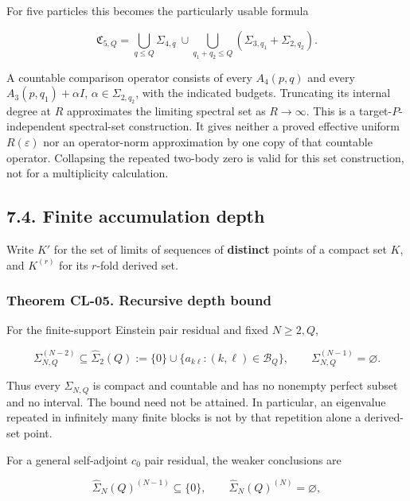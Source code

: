 For five particles this becomes the particularly usable formula

\[
\mathfrak C_{5,Q}=
\bigcup_{q\leq Q}\Sigma_{4,q}
\ \cup\!
\bigcup_{q_1+q_2\leq Q}(\Sigma_{3,q_1}+\Sigma_{2,q_2}).
\tag{CL.14}
\]

A countable comparison operator consists of every \(A_4(p,q)\) and every \(A_3(p,q_1)+\alpha I\), \(\alpha\in\Sigma_{2,q_2}\), with the indicated budgets. Truncating its internal degree at \(R\) approximates the limiting spectral set as \(R\to\infty\). This is a target-\(P\)-independent spectral-set construction. It gives neither a proved effective uniform \(R(\varepsilon)\) nor an operator-norm approximation by one copy of that countable operator. Collapsing the repeated two-body zero is valid for this set construction, not for a multiplicity calculation.

\hypertarget{finite-accumulation-depth}{%
\subsection{7.4. Finite accumulation depth}\label{finite-accumulation-depth}}

Write \(K'\) for the set of limits of sequences of \textbf{distinct} points of a compact set \(K\), and \(K^{(r)}\) for its \(r\)-fold derived set.

\hypertarget{theorem-cl-05.-recursive-depth-bound}{%
\subsubsection{Theorem CL-05. Recursive depth bound}\label{theorem-cl-05.-recursive-depth-bound}}

For the finite-support Einstein pair residual and fixed \(N\geq2,Q\),

\[
\Sigma_{N,Q}^{(N-2)}\subseteq
\widehat\Sigma_2(Q):=\{0\}\cup\{a_{k\ell}:(k,\ell)\in\mathcal B_Q\},
\qquad
\Sigma_{N,Q}^{(N-1)}=\varnothing.
\tag{CL.15}
\]

Thus every \(\Sigma_{N,Q}\) is compact and countable and has no nonempty perfect subset and no interval. The bound need not be attained. In particular, an eigenvalue repeated in infinitely many finite blocks is not by that repetition alone a derived-set point.

For a general self-adjoint \(c_0\) pair residual, the weaker conclusions are

\[
\widehat\Sigma_N(Q)^{(N-1)}\subseteq\{0\},
\qquad \widehat\Sigma_N(Q)^{(N)}=\varnothing,
\]

